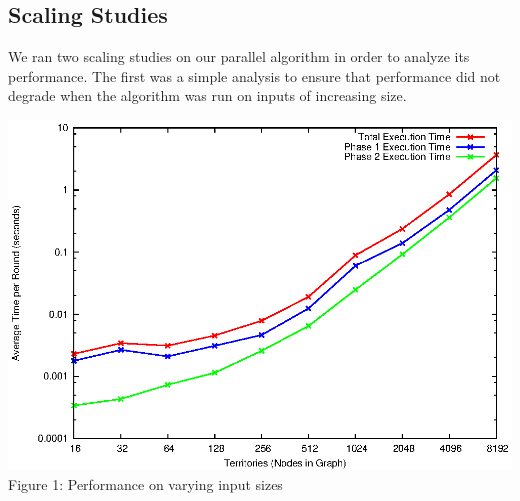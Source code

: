\documentclass[10pt]{article}
\begin{document}
\begin{multicols}{2}
		\subsection*{Scaling Studies}
		We ran two scaling studies on our parallel algorithm in order to analyze its performance.
		The first was a simple analysis to ensure that performance did not degrade when the algorithm was run on inputs of increasing size.
		\begin{center}
			\includegraphics[width=.45\textwidth]{results/graphs/graphs.eps}
			\small{Figure 1: Performance on varying input sizes}
		\end{center}


\end{multicols}
\end{document}
